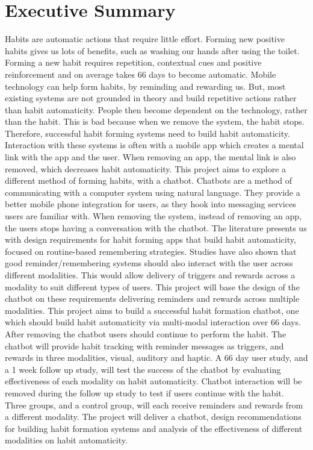 
\section{Executive Summary}

Habits are automatic actions that require little effort. Forming new positive habits gives us lots of benefits, such as washing our hands after using the toilet. Forming a new habit requires repetition, contextual cues and positive reinforcement and on average takes 66 days to become automatic. Mobile technology can help form habits, by reminding and rewarding us. But, most existing systems are not grounded in theory and build repetitive actions rather than habit automaticity. People then become dependent on the technology, rather than the habit. This is bad because when we remove the system, the habit stops. Therefore, successful habit forming systems need to build habit automaticity.\newline
\newline
Interaction with these systems is often with a mobile app which creates a mental link with the app and the user. When removing an app, the mental link is also removed, which decreases habit automaticity. This project aims to explore a different method of forming habits, with a chatbot. Chatbots are a method of communicating with a computer system using natural language. They provide a better mobile phone integration for users, as they hook into messaging services users are familiar with. When removing the system, instead of removing an app, the users stops having a conversation with the chatbot.\newline
\newline
The literature presents us with design requirements for habit forming apps that build habit automaticity, focused on routine-based remembering strategies. Studies have also shown that good reminder/remembering systems should also interact with the user across different modalities. This would allow delivery of triggers and rewards across a modality to suit different types of users. This project will base the design of the chatbot on these requirements delivering reminders and rewards across multiple modalities.\newline
\newline
This project aims to build a successful habit formation chatbot, one which should build habit automaticity via multi-modal interaction over 66 days. After removing the chatbot users should continue to perform the habit. The chatbot will provide habit tracking with reminder messages as triggers, and rewards in three modalities, visual, auditory and haptic. A 66 day user study, and a 1 week follow up study, will test the success of the chatbot by evaluating effectiveness of each modality on habit automaticity. Chatbot interaction will be removed during the follow up study to test if users continue with the habit. Three groups, and a control group, will each receive reminders and rewards from a different modality.\newline
\newline
The project will deliver a chatbot, design recommendations for building habit formation systems and analysis of the effectiveness of different modalities on habit automaticity.

